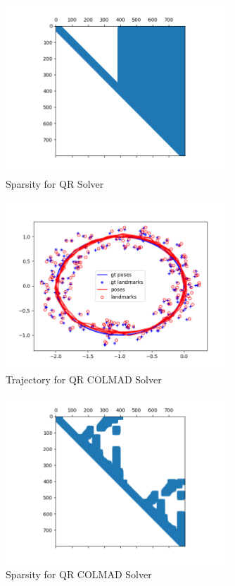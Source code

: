 \documentclass[12pt, a4paper]{article}
\begin{document}
\begin{figure}
    \center
    \includegraphics[width=0.75\textwidth]{linear_loop_results/qr_sparsity_loop.png}
    \caption{Sparsity for QR Solver}
\end{figure}

\begin{figure}
    \center
    \includegraphics[width=0.75\textwidth]{linear_loop_results/qr_colamd.png}
    \caption{Trajectory for QR COLMAD Solver}
\end{figure}

\begin{figure}
    \center
    \includegraphics[width=0.75\textwidth]{linear_loop_results/qr_colamd_sparsity.png}
    \caption{Sparsity for QR COLMAD Solver}
\end{figure}
\end{document}
